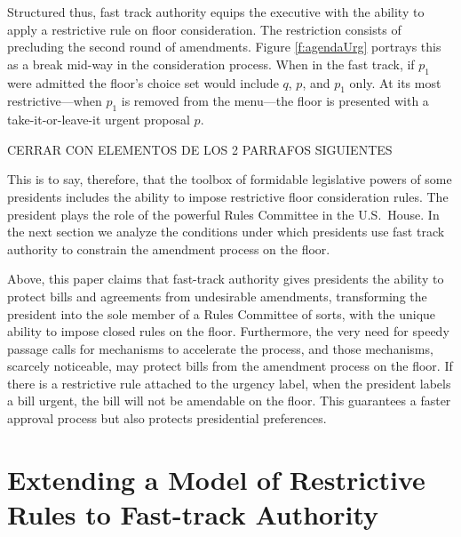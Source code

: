 \documentclass[letter,12pt]{article}
\begin{document}
Structured thus, fast track authority equips the executive with the ability to apply a restrictive rule on floor consideration. The restriction consists of precluding the second round of amendments. Figure \ref{f:agendaUrg} portrays this as a break mid-way in the consideration process. When in the fast track, if $p_1$ were admitted the floor's choice set would include $q$, $p$, and $p_1$ only. At its most restrictive---when $p_1$ is removed from the menu---the floor is presented with a take-it-or-leave-it urgent proposal $p$.

CERRAR CON ELEMENTOS DE LOS 2 PARRAFOS SIGUIENTES

This is to say, therefore, that the toolbox of formidable legislative powers of some presidents includes the ability to impose restrictive floor consideration rules. The president plays the role of the powerful Rules Committee in the U.S.\ House. In the next section we analyze the conditions under which presidents use fast track authority to constrain the amendment process on the floor. 

Above, this paper claims that fast-track authority gives presidents the ability to protect bills and agreements from undesirable amendments, transforming the president into the sole member of a Rules Committee of sorts, with the unique ability to impose closed rules on the floor. Furthermore, the very need for speedy passage calls for mechanisms to accelerate the process, and those mechanisms, scarcely noticeable, may protect bills from the amendment process on the floor. If there is a restrictive rule attached to the urgency label, when the president labels a bill urgent, the bill will not be amendable on the floor. This guarantees a faster approval process but also protects presidential preferences.


\section{Extending a Model of Restrictive Rules to Fast-track Authority}
\end{document}
